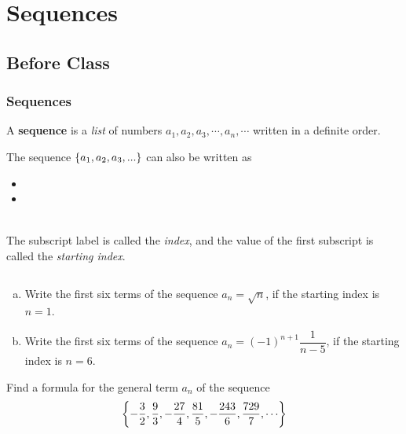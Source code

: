 \documentclass[notes]{subfiles}
\begin{document}
	\fancyhead[LO,RE]{\bfseries \small \currentname}
	\fancyfoot[C]{{}}
	\fancyfoot[RO,LE]{\large \thepage}	%
	
\section*{Sequences}\label{cs111}
	\subsection*{Before Class}
	\subsubsection*{Sequences}
		\begin{defn}[Sequence]
			A \textbf{sequence} is a \textit{list} of numbers $a_1,a_2,a_3,\cdots,a_n,\cdots$ written in a definite order.  
		\end{defn}
		\begin{rmk}[Notation]
			The sequence $\left\lbrace a_1,a_2, a_3,... \right\rbrace$ can also be written as\\[10pt]
				\begin{itemize}
					\setlength\itemsep{15pt}
					\item 
					\item
				\end{itemize}\\
			The subscript label is called the \emph{index}, and the value of the first subscript is called the \emph{starting index}.
		\end{rmk}
		\begin{ex}$ $
			\begin{enumerate}[(a)]
				\item Write the first six terms of the sequence $a_n = \sqrt{n}$, if the starting index is $n = 1$.
					
				\item Write the first six terms of the sequence $a_n = (-1)^{n+1}\dfrac{1}{n-5}$, if the starting index is $n = 6$.
			\end{enumerate}
		\end{ex}
		
		\begin{ex}
			Find a formula for the general term $a_n$ of the sequence
				\[\lrbrace{-\dfrac{3}{2},\dfrac{9}{3},-\dfrac{27}{4},\dfrac{81}{5},-\dfrac{243}{6},\dfrac{729}{7},\cdots}\]
		\end{ex}
			\newpage
			
\end{document}
